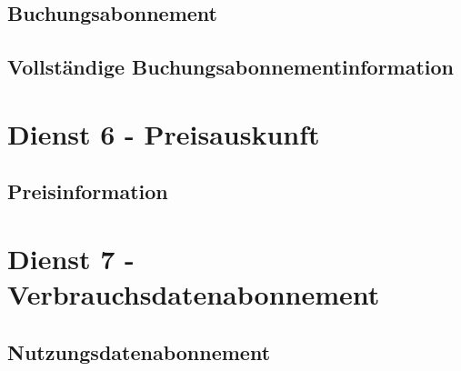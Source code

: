 \subsection*{Buchungsabonnement}
\label{subsec:Nachrichten:Dienst5:BookingAlertSubscription}





% 

% 



\subsection*{Vollständige Buchungsabonnementinformation}
\label{subsec:Nachrichten:Dienst5:CompleteBookingAlert}





\section{Dienst 6 - Preisauskunft}
\label{sec:Nachrichten:Dienst6}

\subsection*{Preisinformation}
\label{subsec:Nachrichten:Dienst6:PriceInformation}





\section{Dienst 7 - Verbrauchsdatenabonnement}
\label{sec:Nachrichten:Dienst7}

\subsection*{Nutzungsdatenabonnement}
\label{subsec:Nachrichten:Dienst7:ConsumptionSubscription}









